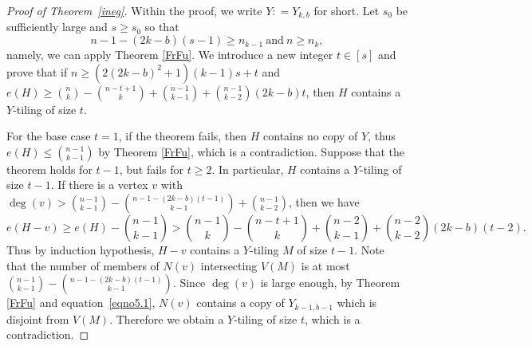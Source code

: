 \documentclass[11pt, reqno]{amsart}    	%
\theoremstyle{definition}
\numberwithin{equation}{section}
\begin{document}
	
	\begin{proof}[Proof of Theorem~\ref{ineg}]
		Within the proof, we write $Y: = Y_{k, b}$ for short.
		Let $s_0$ be sufficiently  large and $ s\ge s_0$ so that \begin{equation}\label{eqno5.1}
		n-1-(2k-b)(s-1) \ge n_{k-1} \  \text{and} \  n \ge n_k,
		\end{equation} 
		namely, we can apply Theorem \ref{FrFu}.  We introduce a new integer $ t \in [s] $ and
	 prove that if $ n \ge (2(2k-b)^2+1)(k-1)s+t$ and $e(H) \ge \binom{n}{k} - \binom{n-t+1}{k} +  \binom{n-1}{k-1}+ \binom{n-1}{k-2}(2k-b)t$, then $H$ contains a $Y$-tiling of size $t$.
		
		For the base case $t =1$, if the theorem fails, then $H$  contains no copy of $Y$, thus $e(H)\le \binom{n-1}{k-1}$  by Theorem \ref{FrFu}, which is a contradiction.
		Suppose that the theorem holds for $t-1$, but fails for $t \ge 2$. 
		In particular, $H$ contains a $Y$-tiling of size $t-1$.
		If there is a vertex $v$ with $\deg (v) > \binom{n-1}{k-1} - \binom{n-1-(2k-b)(t-1)}{k-1} + \binom{n-1}{k-2}$,
		then we have
		\[
		e(H - v) \ge e(H) - \binom{n-1}{k-1}  >\binom{n-1}{k} - \binom{n-t+1}{k} + \binom{n-2}{k-1}+\binom{n-2}{k-2}(2k-b)(t-2).
		\]
		Thus by induction hypothesis, $H-v$ contains a $Y$-tiling $M$ of size $t-1$. Note that the number of members of $ N(v) $ intersecting $ V(M) $ is at most $ \binom{n-1}{k-1} - \binom{n-1-(2k-b)(t-1)}{k-1}  $.
		Since $\deg (v)$ is large enough, by Theorem \ref{FrFu} and equation~\ref{eqno5.1}, $ N(v) $ contains a copy of $ Y_{k-1, b-1} $ which is disjoint from $ V(M) $.
		Therefore we obtain a $Y$-tiling of size $t$, which is a contradiction.
		

\end{proof}
\end{document}
